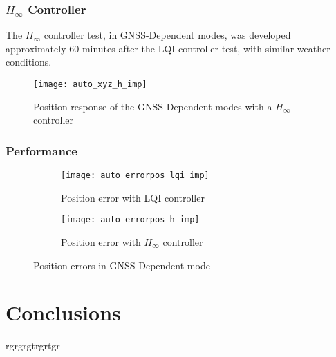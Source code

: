 \subsubsection{$H_\infty$ Controller}
The $H_\infty$ controller test, in GNSS-Dependent modes, was developed approximately $60$ minutes after the LQI controller test, with similar weather conditions.
\begin{figure}[h]
	\begin{center}
	\texttt{[image: auto\_xyz\_h\_imp]}
	\caption{Position response of the GNSS-Dependent modes with a $H_\infty$ controller}
	\label{fig:auto_xyz_h_imp}
	\end{center}
	\end{figure}
%	


\subsubsection{Performance}

\begin{figure}[h]
\begin{subfigure}{.5\linewidth}
\centering
\texttt{[image: auto\_errorpos\_lqi\_imp]}
\caption{Position error with LQI controller}
\label{fig:auto_errorpos_lqi_imp}
\end{subfigure}%
\begin{subfigure}{.5\linewidth}
\centering
\texttt{[image: auto\_errorpos\_h\_imp]}
\caption{Position error with $H_\infty$ controller}
\label{fig:auto_errorpos_h_imp}
\end{subfigure}
\caption{Position errors in GNSS-Dependent mode}
\label{fig:auto_errorpos_imp}
\end{figure}



\section{Conclusions}
rgrgrgtrgrtgr
